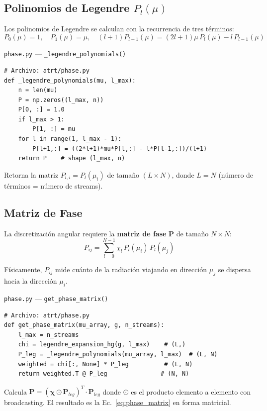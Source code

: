 \documentclass[a4paper,11pt]{article}
\begin{document}
\subsection{Polinomios de Legendre $P_l(\mu)$}

Los polinomios de Legendre se calculan con la recurrencia de tres t\'erminos:
\begin{equation}
P_0(\mu) = 1, \quad P_1(\mu) = \mu, \quad (l+1)P_{l+1}(\mu) = (2l+1)\mu \, P_l(\mu) - l \, P_{l-1}(\mu)
\label{eq:legendre_recurrence}
\end{equation}

\begin{implementation}{\texttt{phase.py} --- \texttt{\_legendre\_polynomials()}}
\begin{lstlisting}
# Archivo: atrt/phase.py
def _legendre_polynomials(mu, l_max):
    n = len(mu)
    P = np.zeros((l_max, n))
    P[0, :] = 1.0
    if l_max > 1:
        P[1, :] = mu
    for l in range(1, l_max - 1):
        P[l+1,:] = ((2*l+1)*mu*P[l,:] - l*P[l-1,:])/(l+1)
    return P    # shape (l_max, n)
\end{lstlisting}
Retorna la matriz $P_{l,i} = P_l(\mu_i)$ de tama\~no $(L \times N)$, donde $L = N$ (n\'umero de t\'erminos = n\'umero de streams).
\end{implementation}

\subsection{Matriz de Fase}

La discretizaci\'on angular requiere la \textbf{matriz de fase} $\mathbf{P}$ de tama\~no $N \times N$:
\begin{equation}
\boxed{P_{ij} = \sum_{l=0}^{N-1} \chi_l \, P_l(\mu_i) \, P_l(\mu_j)}
\label{eq:phase_matrix}
\end{equation}

F\'isicamente, $P_{ij}$ mide cu\'anto de la radiaci\'on viajando en direcci\'on $\mu_j$ se dispersa hacia la direcci\'on $\mu_i$.

\begin{implementation}{\texttt{phase.py} --- \texttt{get\_phase\_matrix()}}
\begin{lstlisting}
# Archivo: atrt/phase.py
def get_phase_matrix(mu_array, g, n_streams):
    l_max = n_streams
    chi = legendre_expansion_hg(g, l_max)    # (L,)
    P_leg = _legendre_polynomials(mu_array, l_max)  # (L, N)
    weighted = chi[:, None] * P_leg          # (L, N)
    return weighted.T @ P_leg               # (N, N)
\end{lstlisting}
Calcula $\mathbf{P} = (\bm{\chi} \odot \mathbf{P}_{leg})^T \cdot \mathbf{P}_{leg}$ donde $\odot$ es el producto elemento a elemento con broadcasting. El resultado es la Ec.~\eqref{eq:phase_matrix} en forma matricial.
\end{implementation}
\end{document}
